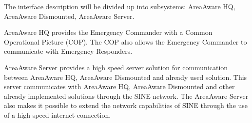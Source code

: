 The interface description will be divided up into subsystems: AreaAware HQ, AreaAware Dismounted, AreaAware Server.

AreaAware HQ provides the Emergency Commander with a Common Operational Picture (COP). The COP also allows the Emergency Commander to communicate with Emergency Responders.

AreaAware Server provides a high speed server solution for communication between AreaAware HQ, AreaAware Dismounted and already used solution. This server communicates with AreaAware HQ, AreaAware Dismounted and other already implemented solutions through the SINE network. The AreaAware Server also makes it possible to extend the network capabilities of SINE through the use of a high speed internet connection.

